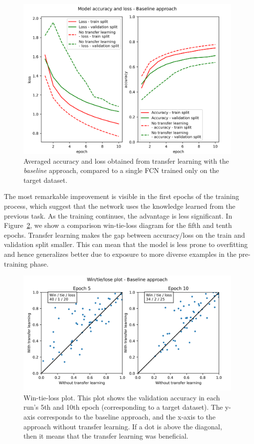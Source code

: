 \documentclass[a4paper,11pt,twoside]{report}
\theoremstyle{definition}
\begin{document}
\begin{figure}[h!t]
\centering
\includegraphics[width=17 cm]{imgs/baseline/loss_acc.png}
\caption{Averaged accuracy and loss obtained from transfer learning with the \textit{baseline} approach, compared to a single FCN trained only on the target dataset.}
\label{fig:baseline_acc}
\end{figure}
\FloatBarrier
The most remarkable improvement is visible in the first epochs of the training process, which suggest that the network uses the knowledge learned from the previous task. As the training continues, the advantage is less significant. In Figure~\ref{fig:win_tie_loss_baseline}, we show a comparison win-tie-loss diagram for the fifth and tenth epochs.
Transfer learning makes the gap between accuracy/loss on the train and validation split smaller. This can mean that the model is less prone to overfitting and hence generalizes better due to exposure to more diverse examples in the pre-training phase.
\FloatBarrier
\begin{figure}[h!t]
\centering
\includegraphics[width=17 cm]{imgs/baseline/win_tie_lose_epoch.png}
\caption{Win-tie-loss plot. This plot shows the validation accuracy in each run's 5th and 10th epoch (corresponding to a target dataset). The y-axis corresponds to the baseline approach, and the x-axis to the approach without transfer learning. If a dot is above the diagonal, then it means that the transfer learning was beneficial.}
\label{fig:win_tie_loss_baseline}
\end{figure}
\end{document}
